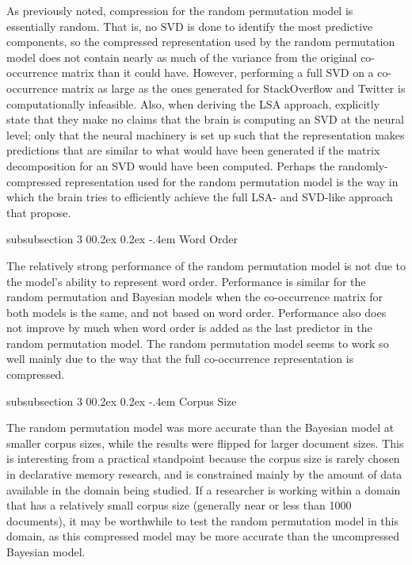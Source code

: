 \documentclass[man,floatsintext,donotrepeattitle]{apa6}
\makeatletter
\renewcommand{\subsubsection}{%
  \@startsection
  {subsubsection}%
  {3}%
  {\parindent}%
  {0\baselineskip \@plus 0.2ex \@minus 0.2ex}%
  {-.4em}%
  {\normalfont\normalsize\bfseries\addperi}}
\makeatother
\begin{document}
As previously noted, compression for the random permutation model is essentially random.
That is, no SVD is done to identify the most predictive components,
so the compressed representation used by the random permutation model does not contain nearly as much of the variance from the original co-occurrence matrix than it could have.
However, performing a full SVD on a co-occurrence matrix as large as the ones generated for StackOverflow and Twitter is computationally infeasible.
Also, when deriving the LSA approach, \textcite{Landauer1997} explicitly state that they make no claims that the brain is computing an SVD at the neural level;
only that the neural machinery is set up such that the representation makes predictions that are similar to what would have been generated if the matrix decomposition for an SVD would have been computed.
Perhaps the randomly-compressed representation used for the random permutation model is the way in which the brain tries to efficiently achieve the full LSA- and SVD-like approach that \citeauthor{Landauer1997} propose.

\subsubsection{Word Order}

The relatively strong performance of the random permutation model is not due to the model's ability to represent word order.
Performance is similar for the random permutation and Bayesian models when the co-occurrence matrix for both models is the same, and not based on word order.
Performance also does not improve by much when word order is added as the last predictor in the random permutation model.
The random permutation model seems to work so well mainly due to the way that the full co-occurrence representation is compressed.

\subsubsection{Corpus Size}

The random permutation model was more accurate than the Bayesian model at smaller corpus sizes, while the results were flipped for larger document sizes.
This is interesting from a practical standpoint because the corpus size is rarely chosen in declarative memory research, and is constrained mainly by the amount of data available in the domain being studied.
If a researcher is working within a domain that has a relatively small corpus size (generally near or less than \num{1000} documents),
it may be worthwhile to test the random permutation model in this domain, as this compressed model may be more accurate than the uncompressed Bayesian model.
\end{document}
